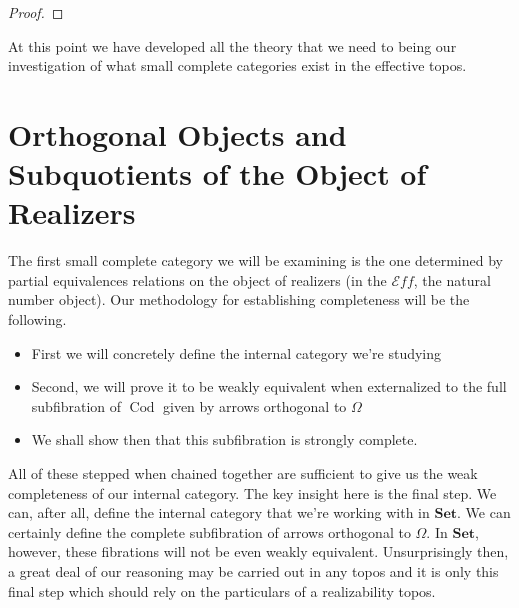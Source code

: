 \documentclass[12pt]{amsart}
\newcommand{\todo}[1]{{\color{red}{\LARGE #1}}}
\newcommand{\cat}[1]{\ensuremath{\mathbf{#1}}}
\newcommand{\set}{\cat{Set}}
\newcommand{\eff}{\mathcal{E}\!f\!f}
\DeclareMathOperator{\cod}{Cod}
\begin{document}
\begin{proof}
  \todo{Really tricky but very important}
\end{proof}
At this point we have developed all the theory that we need to being
our investigation of what small complete categories exist in the
effective topos.

\section{Orthogonal Objects and Subquotients of the Object of Realizers}\label{sec:orth}

The first small complete category we will be examining is the one
determined by partial equivalences relations on the object of
realizers (in the $\eff$, the natural number object). Our methodology
for establishing completeness will be the following.
\begin{itemize}
\item First we will concretely define the internal category we're
  studying
\item Second, we will prove it to be weakly equivalent when
  externalized to the full subfibration of $\cod$ given by arrows
  orthogonal to $\Omega$
\item We shall show then that this subfibration is strongly complete.
\end{itemize}
All of these stepped when chained together are sufficient to give us
the weak completeness of our internal category. The key insight here
is the final step. We can, after all, define the internal category
that we're working with in $\set$. We can certainly define the
complete subfibration of arrows orthogonal to $\Omega$. In $\set$,
however, these fibrations will not be even weakly
equivalent. Unsurprisingly then, a great deal of our reasoning may be
carried out in any topos and it is only this final step which should
rely on the particulars of a realizability topos.
\end{document}
